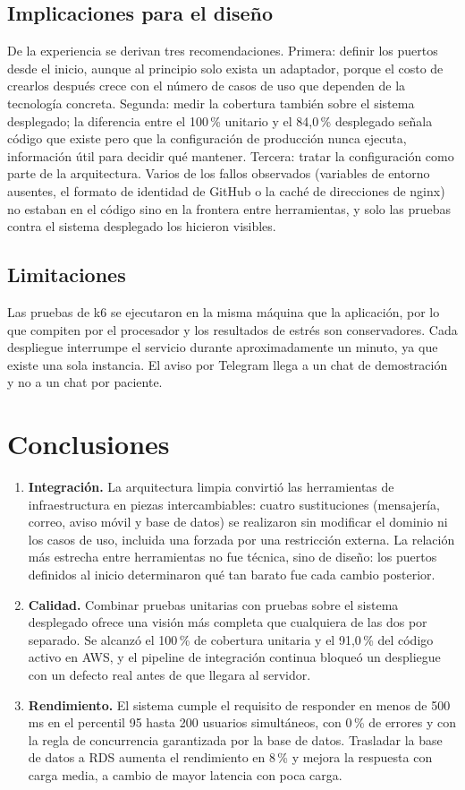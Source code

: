 \documentclass[conference]{IEEEtran}
\begin{document}
\subsection{Implicaciones para el diseño}
De la experiencia se derivan tres recomendaciones. Primera: definir los puertos desde el inicio, aunque al principio solo exista un adaptador, porque el costo de crearlos después crece con el número de casos de uso que dependen de la tecnología concreta. Segunda: medir la cobertura también sobre el sistema desplegado; la diferencia entre el 100\,\% unitario y el 84,0\,\% desplegado señala código que existe pero que la configuración de producción nunca ejecuta, información útil para decidir qué mantener. Tercera: tratar la configuración como parte de la arquitectura. Varios de los fallos observados (variables de entorno ausentes, el formato de identidad de GitHub o la caché de direcciones de nginx) no estaban en el código sino en la frontera entre herramientas, y solo las pruebas contra el sistema desplegado los hicieron visibles.

\subsection{Limitaciones}
Las pruebas de k6 se ejecutaron en la misma máquina que la aplicación, por lo que compiten por el procesador y los resultados de estrés son conservadores. Cada despliegue interrumpe el servicio durante aproximadamente un minuto, ya que existe una sola instancia. El aviso por Telegram llega a un chat de demostración y no a un chat por paciente.

\section{Conclusiones}
\begin{enumerate}
\item \textbf{Integración.} La arquitectura limpia convirtió las herramientas de infraestructura en piezas intercambiables: cuatro sustituciones (mensajería, correo, aviso móvil y base de datos) se realizaron sin modificar el dominio ni los casos de uso, incluida una forzada por una restricción externa. La relación más estrecha entre herramientas no fue técnica, sino de diseño: los puertos definidos al inicio determinaron qué tan barato fue cada cambio posterior.
\item \textbf{Calidad.} Combinar pruebas unitarias con pruebas sobre el sistema desplegado ofrece una visión más completa que cualquiera de las dos por separado. Se alcanzó el 100\,\% de cobertura unitaria y el 91,0\,\% del código activo en AWS, y el pipeline de integración continua bloqueó un despliegue con un defecto real antes de que llegara al servidor.
\item \textbf{Rendimiento.} El sistema cumple el requisito de responder en menos de 500\,ms en el percentil 95 hasta 200 usuarios simultáneos, con 0\,\% de errores y con la regla de concurrencia garantizada por la base de datos. Trasladar la base de datos a RDS aumenta el rendimiento en 8\,\% y mejora la respuesta con carga media, a cambio de mayor latencia con poca carga.
\end{enumerate}
\end{document}
